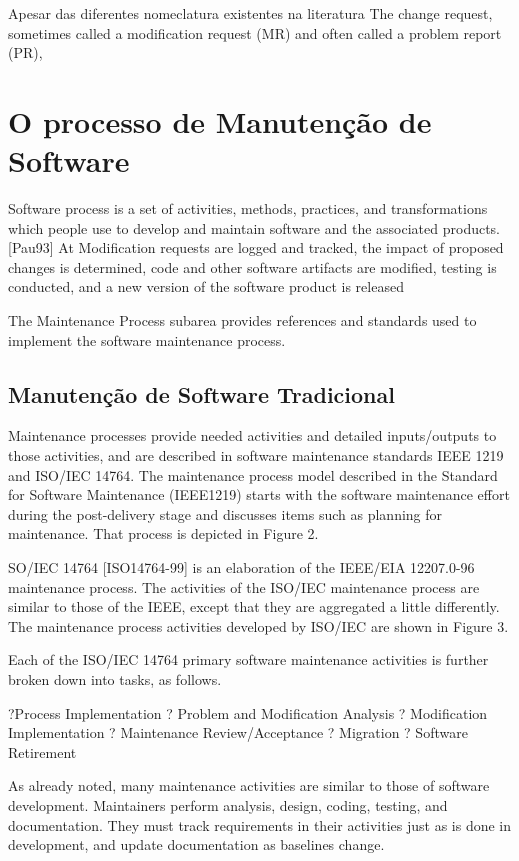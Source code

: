 Apesar das diferentes nomeclatura existentes na literatura The change request,
sometimes called a modification
request (MR) and often called a problem report (PR),
 
 \section{O processo de Manutenção de Software}
\label{sec:o_processo_de_manutecao_de_software}

Software process is a set of activities, methods, practices, and transformations which people use to
develop and maintain software and the associated products. [Pau93] At Modification requests are logged and tracked, the impact of proposed changes is determined, code and other software artifacts are modified, testing is conducted, and a new version of the software product is released

The Maintenance Process subarea provides references and standards used to implement the software
maintenance process.
\subsection{Manutenção de Software Tradicional}
\label{subsec:manutenção_de_software_tradicional}
Maintenance processes provide needed activities and
detailed inputs/outputs to those activities, and are described in software maintenance standards
IEEE 1219 and ISO/IEC 14764.
The maintenance process model described in the Standard for Software Maintenance (IEEE1219) starts
with the software maintenance effort during the post-delivery stage and discusses items such as
planning for maintenance. That process is depicted in Figure 2.

SO/IEC 14764 [ISO14764-99]
is an elaboration of the
IEEE/EIA 12207.0-96 maintenance process. The activities of the ISO/IEC maintenance process are
similar to those of the IEEE, except that they are aggregated a little differently. The maintenance
process activities developed by ISO/IEC are shown in Figure 3.

Each of the ISO/IEC 14764 primary software maintenance activities is further broken down into tasks,
as follows.

?Process Implementation ? Problem and Modification Analysis ? Modification Implementation ?
Maintenance Review/Acceptance ? Migration ? Software Retirement

As already noted, many maintenance activities are similar to those of software development.
Maintainers perform analysis, design, coding, testing, and documentation. They must track
requirements in their activities just as is done in development, and update
documentation as
baselines
change.

